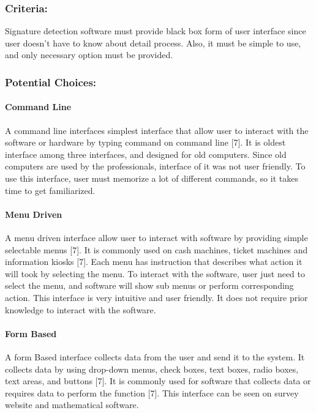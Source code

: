 \documentclass[article, onecolumn, draftclsnofoot,10pt, compsoc]{IEEEtran}
\begin{document}
\subsubsection{Criteria:}
Signature detection software must provide black box form of user interface since user doesn\rq t have to know about detail process. Also, it must be simple to use, and only necessary option must be provided.

\subsubsection{Potential Choices:}
\paragraph{Command Line}
A command line interfaces simplest interface that allow user to interact with the software or hardware by typing command on command line [7]. It is oldest interface among three interfaces, and designed for old computers. Since old computers are used by the professionals, interface of it was not user friendly. To use this interface, user must memorize a lot of different commands, so it takes time to get familiarized.

\paragraph{Menu Driven}
A menu driven interface allow user to interact with software by providing simple selectable menus [7]. It is commonly used on cash machines, ticket machines and information kiosks [7]. Each menu has instruction that describes what action it will took by selecting the menu. To interact with the software, user just need to select the menu, and software will show sub menus or perform corresponding action. This interface is very intuitive and user friendly. It does not require prior knowledge to interact with the software.

\paragraph{Form Based}
A form Based interface collects data from the user and send it to the system. It collects data by using drop-down menus, check boxes, text boxes, radio boxes, text areas, and buttons [7]. It is commonly used for software that collects data or requires data to perform the function [7]. This interface can be seen on survey website and mathematical software.  
\end{document}
